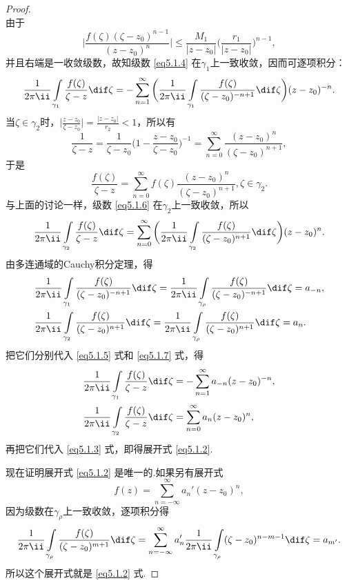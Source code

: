 \begin{proof}
\begin{equation}
\end{equation}
由于
\[\bigg|\frac{f(\zeta)(\zeta-z_0)^{n-1}}{(z-z_0)^n}\bigg|
\le\frac{M_1}{|z-z_0|}\bigg(\frac{r_1}{|z-z_0|}\bigg)^{n-1},\]
并且右端是一收敛级数，故知级数 \eqref{eq5.1.4} 在$\gamma_1$上一致收敛，因而可逐项积分：
\begin{equation}\label{eq5.1.5}
\frac1{2\pi\ii}\int\limits_{\gamma_1}\frac{f(\zeta)}{\zeta-z}\dif \zeta
=-\sum_{n=1}^\infty\bigg(\frac1{2\pi\ii}\int\limits_{\gamma_1}
\frac{f(\zeta)}{(\zeta-z_0)^{-n+1}}\dif \zeta\bigg)(z-z_0)^{-n}.
\end{equation}
当$\zeta\in\gamma_2$时，$\bigg|\frac{z-z_0}{\zeta-z_0}\bigg|=\frac{|z-z_0|}{r_2}<1$，所以有
\[\frac1{\zeta-z}=\frac1{\zeta-z_0}\bigg(1-\frac{z-z_0}{\zeta-z_0}\bigg)^{-1}
=\sum_{n=0}^\infty\frac{(z-z_0)^n}{(\zeta-z_0)^{n+1}},\]
于是
\begin{equation}\label{eq5.1.6}
\frac{f(\zeta)}{\zeta-z}=\sum_{n=0}^\infty f(\zeta)\frac{(z-z_0)^{n}}{(\zeta-z_0)^{n+1}},\zeta\in\gamma_2.
\end{equation}
与上面的讨论一样，级数 \eqref{eq5.1.6} 在$\gamma_2$上一致收敛，所以
\begin{equation}\label{eq5.1.7}
\frac1{2\pi\ii}\int\limits_{\gamma_2}\frac{f(\zeta)}{\zeta-z}\dif \zeta
=\sum_{n=0}^\infty\bigg(\frac1{2\pi\ii}\int\limits_{\gamma_2}
\frac{f(\zeta)}{(\zeta-z_0)^{n+1}}\dif \zeta\bigg)(z-z_0)^{n}.
\end{equation}
由多连通域的Cauchy积分定理，得
\begin{align*}
&\frac1{2\pi\ii}\int\limits_{\gamma_1}
\frac{f(\zeta)}{(\zeta-z_0)^{-n+1}}\dif \zeta
=\frac1{2\pi\ii}\int\limits_{\gamma_\rho}
\frac{f(\zeta)}{(\zeta-z_0)^{-n+1}}\dif \zeta=a_{-n},\\
&\frac1{2\pi\ii}\int\limits_{\gamma_2}
\frac{f(\zeta)}{(\zeta-z_0)^{n+1}}\dif \zeta
=\frac1{2\pi\ii}\int\limits_{\gamma_\rho}
\frac{f(\zeta)}{(\zeta-z_0)^{n+1}}\dif \zeta=a_{n}.
\end{align*}
把它们分别代入 \eqref{eq5.1.5} 式和 \eqref{eq5.1.7} 式，得
\begin{align*}
&\frac1{2\pi\ii}\int\limits_{\gamma_1}\frac{f(\zeta)}{\zeta-z}\dif \zeta
=-\sum_{n=1}^\infty a_{-n}(z-z_0)^{-n},\\
&\frac1{2\pi\ii}\int\limits_{\gamma_2}\frac{f(\zeta)}{\zeta-z}\dif \zeta
=\sum_{n=0}^\infty a_n(z-z_0)^n,
\end{align*}
再把它们代入 \eqref{eq5.1.3} 式，即得展开式 \eqref{eq5.1.2}.

现在证明展开式 \eqref{eq5.1.2} 是唯一的.如果另有展开式
\[f(z)=\sum_{n=-\infty}^{\infty}a_n'(z-z_0)^n,\]
因为级数在$\gamma_\rho$上一致收敛，逐项积分得
\[\frac1{2\pi\ii}\int\limits_{\gamma_\rho}
\frac{f(\zeta)}{(\zeta-z_0)^{m+1}}\dif \zeta
=\sum_{n=-\infty}^\infty a_n'\frac1{2\pi\ii}
\int\limits_{\gamma_\rho}(\zeta-z_0)^{n-m-1}\dif \zeta=a_{m'}.\]
所以这个展开式就是 \eqref{eq5.1.2} 式.
\end{proof}

